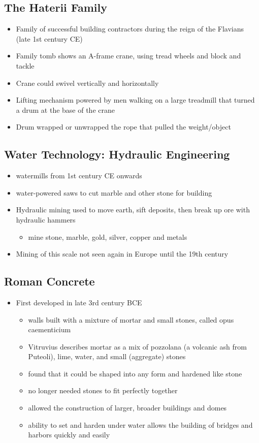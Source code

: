 \documentclass[12pt, twoside]{article}
\begin{document}
\begin{itemize}
\subsection{The Haterii Family}
\begin{itemize}
\item Family of successful building contractors during the reign of the Flavians (late 1st century CE)
\item Family tomb shows an A-frame crane, using tread wheels and block and tackle
\item Crane could swivel vertically and horizontally
\item Lifting mechanism powered by men walking on a large treadmill that turned a drum at the base of the crane
\item Drum wrapped or unwrapped the rope that pulled the weight/object
\end{itemize}

\subsection{Water Technology: Hydraulic Engineering}
\begin{itemize}
\item watermills from 1st century CE onwards
\item water-powered saws to cut marble and other stone for building
\item Hydraulic mining used to move earth, sift deposits, then break up ore with hydraulic hammers
	\begin{itemize}
	\item mine stone, marble, gold, silver, copper and metals
	\end{itemize}
\item Mining of this scale not seen again in Europe until the 19th century
\end{itemize}

\subsection{Roman Concrete}
\begin{itemize}
\item First developed in late 3rd century BCE
	\begin{itemize}
	\item walls built with a mixture of mortar and small stones, called opus caementicium
	\item Vitruvius describes mortar as a mix of pozzolana (a volcanic ash from Puteoli), lime, water, and small (aggregate) stones
	\item found that it could be shaped into any form and hardened like stone
	\item no longer needed stones to fit perfectly together
	\item allowed the construction of larger, broader buildings and domes
	\item ability to set and harden under water allows the building of bridges and harbors quickly and easily
	\end{itemize}
\end{itemize}


\end{itemize}
\end{document}
